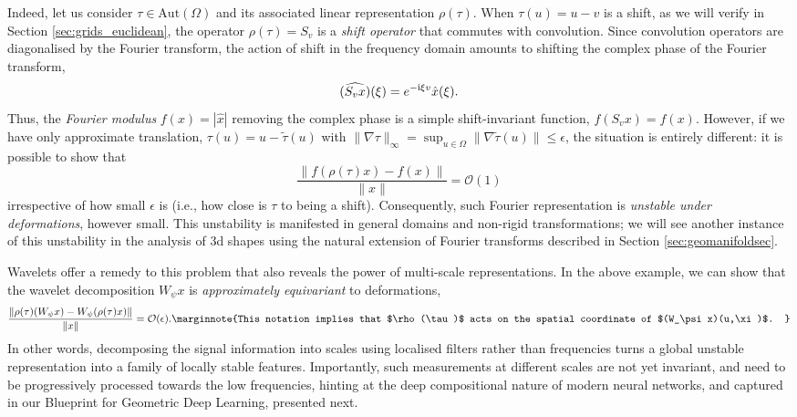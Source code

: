 Indeed, let us consider $\tau \in \mathrm{Aut}(\Omega)$ and its associated linear representation $\rho(\tau)$. When $\tau(u) = u - v$ is a shift, 
as we will verify in Section \ref{sec:grids_euclidean}, the operator $\rho(\tau) = S_v$ is a {\em shift operator} that commutes with convolution. 
Since convolution operators are diagonalised by the Fourier transform, the action of shift in the frequency domain amounts to shifting the complex phase of the Fourier transform,  
%
$$
(\widehat{S_v x})(\xi) = e^{-\mathrm{i} \xi v} \hat{x}(\xi). 
$$ 
Thus, the {\em Fourier modulus} $f(x) = |\hat{x}|$ removing the complex phase is a simple shift-invariant function, $f(S_v x) = f(x)$. 
%
However, if we have only approximate translation, 
$\tau(u) = u - \tilde{\tau}(u)$ with $\|\nabla \tau \|_\infty = \sup_{u\in \Omega} \| \nabla \tilde{\tau}(u)\| \leq \epsilon$,  
the situation is entirely different: it is possible to show that 
$$
\frac{\|f(\rho(\tau) x) - f(x) \| }{ \|x\| }= \mathcal{O}(1)
$$ 
irrespective of how small $\epsilon$ is (i.e., how close is $\tau$ to being a shift). Consequently, such Fourier representation is {\em unstable under deformations}, however small. This unstability is manifested in general domains and non-rigid transformations; we will see another instance of this unstability in the analysis of 3d shapes using the natural extension of Fourier transforms described in Section \ref{sec:geomanifoldsec}. 

Wavelets offer a remedy to this problem that also reveals the power of multi-scale representations. In the above example, we can show \citep{mallat2012group} that the wavelet decomposition $W_\psi x$ is {\em approximately equivariant} to deformations,
$$
\frac{\| \rho(\tau) (W_\psi x) - W_\psi (\rho(\tau) x) \|}{\|x\|} = \mathcal{O}(\epsilon).
\marginnote{This notation implies that $\rho(\tau)$ acts on the spatial coordinate of $(W_\psi x)(u,\xi)$.
}
$$
%
In other words, decomposing the signal information into scales using localised filters rather than frequencies turns a global unstable representation into a family of locally stable features. Importantly, such measurements at different scales are not yet invariant, and need to be progressively processed towards the low frequencies, hinting at the deep compositional nature of modern neural networks, and captured in our Blueprint for Geometric Deep Learning, presented next. 



